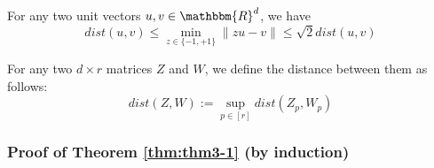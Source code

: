 \begin{lemma}
For any two unit vectors $u,v\in\mathbbm{R}^d$, we have
\begin{equation*}
dist(u,v)\leq \min_{z\in \{-1,+1\}} \lVert zu-v \rVert \leq \sqrt{2}dist(u,v)
\end{equation*}
\label{lemma:l4}
\end{lemma}
\begin{definition}
For any two $d\times r$ matrices $Z$ and $W$, we define the distance between them as follows:
\begin{equation*}
dist(Z,W):=\sup_{p\in[r]} dist(Z_p,W_p)
\end{equation*}
\label{def:def2}
\end{definition}

\subsubsection{Proof of Theorem \ref{thm:thm3-1} (by induction)}

